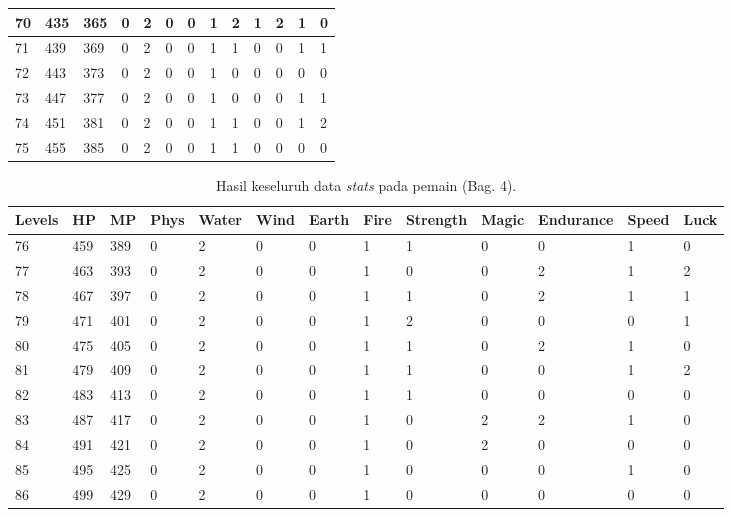 \begin{sidewaystable}[!h]
\begin{tabular}{|l|l|l|l|l|l|l|l|l|l|l|l|l|}
			70 & 435 & 365 & 0 & 2 & 0 & 0 & 1 & 2 & 1 & 2 & 1 & 0 \\ \hline
			71 & 439 & 369 & 0 & 2 & 0 & 0 & 1 & 1 & 0 & 0 & 1 & 1 \\ \hline
			72 & 443 & 373 & 0 & 2 & 0 & 0 & 1 & 0 & 0 & 0 & 0 & 0 \\ \hline
			73 & 447 & 377 & 0 & 2 & 0 & 0 & 1 & 0 & 0 & 0 & 1 & 1 \\ \hline
			74 & 451 & 381 & 0 & 2 & 0 & 0 & 1 & 1 & 0 & 0 & 1 & 2 \\ \hline
			75 & 455 & 385 & 0 & 2 & 0 & 0 & 1 & 1 & 0 & 0 & 0 & 0 \\ \hline
		\end{tabular}
\end{sidewaystable}
\clearpage


\begin{sidewaystable}[!h]
	\centering
	\caption{Hasil keseluruh data \textit{stats} pada pemain (Bag. 4).}
	\label{tb:player_all_stats_4}
	\vspace{1ex}
		\begin{tabular}{|l|l|l|l|l|l|l|l|l|l|l|l|l|}
			\hline
			\rowcolor[HTML]{C0C0C0} 
			\textbf{Levels} & \textbf{HP} & \textbf{MP} & \textbf{Phys} & \textbf{Water} & \textbf{Wind} & \textbf{Earth} & \textbf{Fire} & \textbf{Strength} & \textbf{Magic} & \textbf{Endurance} & \textbf{Speed} & \textbf{Luck} \\ \hline	
			76 & 459 & 389 & 0 & 2 & 0 & 0 & 1 & 1 & 0 & 0 & 1 & 0 \\ \hline
			77 & 463 & 393 & 0 & 2 & 0 & 0 & 1 & 0 & 0 & 2 & 1 & 2 \\ \hline
			78 & 467 & 397 & 0 & 2 & 0 & 0 & 1 & 1 & 0 & 2 & 1 & 1 \\ \hline
			79 & 471 & 401 & 0 & 2 & 0 & 0 & 1 & 2 & 0 & 0 & 0 & 1 \\ \hline
			80 & 475 & 405 & 0 & 2 & 0 & 0 & 1 & 1 & 0 & 2 & 1 & 0 \\ \hline
			81 & 479 & 409 & 0 & 2 & 0 & 0 & 1 & 1 & 0 & 0 & 1 & 2 \\ \hline
			82 & 483 & 413 & 0 & 2 & 0 & 0 & 1 & 1 & 0 & 0 & 0 & 0 \\ \hline
			83 & 487 & 417 & 0 & 2 & 0 & 0 & 1 & 0 & 2 & 2 & 1 & 0 \\ \hline
			84 & 491 & 421 & 0 & 2 & 0 & 0 & 1 & 0 & 2 & 0 & 0 & 0 \\ \hline
			85 & 495 & 425 & 0 & 2 & 0 & 0 & 1 & 0 & 0 & 0 & 1 & 0 \\ \hline
			86 & 499 & 429 & 0 & 2 & 0 & 0 & 1 & 0 & 0 & 0 & 0 & 0 \\ \hline

\end{tabular}
\end{sidewaystable}
